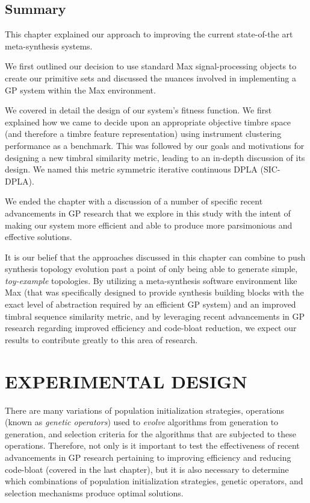 \documentclass[12pt]{report} 	%
\numberwithin{figure}{chapter}
\numberwithin{table}{chapter}
\numberwithin{equation}{chapter}
\begin{document}
\begin{flushleft}
\vspace{12pt}\section{Summary}
This chapter explained our approach to improving the current state-of-the art meta-synthesis systems. 

We first outlined our decision to use standard Max signal-processing objects to create our primitive sets and discussed the nuances involved in implementing a GP system within the Max environment.

We covered in detail the design of our system's fitness function. We first explained how we came to decide upon an appropriate objective timbre space (and therefore a timbre feature representation) using instrument clustering performance as a benchmark. This was followed by our goals and motivations for designing a new timbral similarity metric, leading to an in-depth discussion of its design. We named this metric symmetric iterative continuous DPLA (SIC-DPLA).

We ended the chapter with a discussion of a number of specific recent advancements in GP research that we explore in this study with the intent of making our system more efficient and able to produce more parsimonious and effective solutions.

It is our belief that the approaches discussed in this chapter can combine to push synthesis topology evolution past a point of only being able to generate simple, \textit{toy-example} topologies. By utilizing a meta-synthesis software environment like Max (that was specifically designed to provide synthesis building blocks with the exact level of abstraction required by an efficient GP system) and an improved timbral sequence similarity metric, and by leveraging recent advancements in GP research regarding improved efficiency and code-bloat reduction, we expect our results to contribute greatly to this area of research.
\vspace*{\QuarterPage}
\chapter{EXPERIMENTAL DESIGN} %
There are many variations of population initialization strategies, operations (known as \textit{genetic operators}) used to \textit{evolve} algorithms from generation to generation, and  selection criteria for the algorithms that are subjected to these operations. Therefore, not only is it important to test the effectiveness of recent advancements in GP research pertaining to improving efficiency and reducing code-bloat (covered in the last chapter), but it is also necessary to determine which combinations of population initialization strategies, genetic operators, and selection mechanisms produce optimal solutions.


\end{flushleft}
\end{document}
